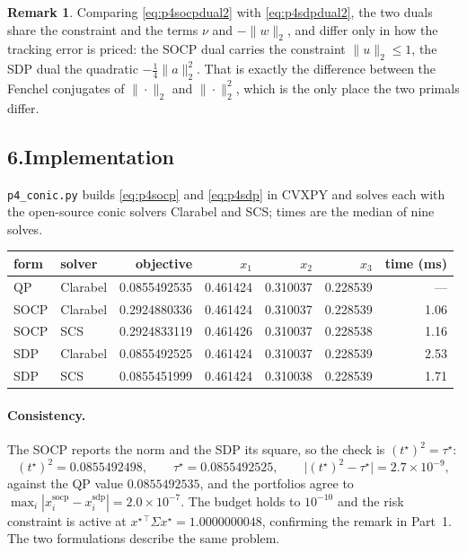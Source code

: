 \documentclass[11pt]{article}
\newcommand{\T}{^{\!\top}}
\theoremstyle{definition}
\newtheorem{remark}{Remark}
\begin{document}
\begin{remark}
Comparing \eqref{eq:p4socpdual2} with \eqref{eq:p4sdpdual2}, the two
duals share the constraint and the terms $\nu$ and $-\|w\|_2$, and
differ only in how the tracking error is priced: the SOCP dual carries
the constraint $\|u\|_2 \le 1$, the SDP dual the quadratic
$-\tfrac14\|a\|_2^2$. That is exactly the difference between the
Fenchel conjugates of $\|\cdot\|_2$ and $\|\cdot\|_2^2$, which is the
only place the two primals differ.
\end{remark}

\subsection*{6.\quad Implementation}

\texttt{p4\_conic.py} builds \eqref{eq:p4socp} and \eqref{eq:p4sdp} in
CVXPY and solves each with the open-source conic solvers Clarabel and
SCS; times are the median of nine solves.

\begin{center}
\begin{tabular}{@{}llrrrrr@{}}
\toprule
form & solver & objective & $x_1$ & $x_2$ & $x_3$ & time (ms)\\
\midrule
QP   & Clarabel & 0.0855492535 & 0.461424 & 0.310037 & 0.228539 & ---\\
SOCP & Clarabel & 0.2924880336 & 0.461424 & 0.310037 & 0.228539 & 1.06\\
SOCP & SCS      & 0.2924833119 & 0.461426 & 0.310037 & 0.228538 & 1.16\\
SDP  & Clarabel & 0.0855492525 & 0.461424 & 0.310037 & 0.228539 & 2.53\\
SDP  & SCS      & 0.0855451999 & 0.461424 & 0.310038 & 0.228539 & 1.71\\
\bottomrule
\end{tabular}
\end{center}

\paragraph{Consistency.} The SOCP reports the norm and the SDP its
square, so the check is $(t^\star)^2 = \tau^\star$:
\[
  (t^\star)^2 = 0.0855492498, \qquad
  \tau^\star = 0.0855492525, \qquad
  \bigl|(t^\star)^2 - \tau^\star\bigr| = 2.7\times10^{-9},
\]
against the QP value $0.0855492535$, and the portfolios agree to
$\max_i|x^{\mathrm{socp}}_i - x^{\mathrm{sdp}}_i| =
2.0\times10^{-7}$. The budget holds to $10^{-10}$ and the risk
constraint is active at $x^\star{}\T\Sigma x^\star = 1.0000000048$,
confirming the remark in Part~1. The two formulations describe the same
problem.
\end{document}
